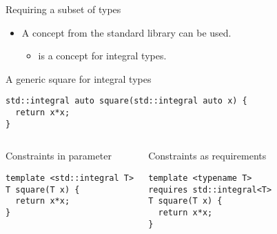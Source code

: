 \begin{frame}[t,fragile]{Requiring a subset of types}
\begin{itemize}
  \item A concept from the standard library can be used.
    \begin{itemize}
      \item {} is a concept for integral types.
    \end{itemize}
\end{itemize}

\begin{block}{A generic square for integral types}
\begin{lstlisting}
std::integral auto square(std::integral auto x) {
  return x*x;
}
\end{lstlisting}
\end{block}

\begin{columns}[T]

\begin{block}{Constraints in parameter}
\begin{lstlisting}
template <std::integral T>
T square(T x) { 
  return x*x; 
}
\end{lstlisting}
\end{block}

\begin{block}{Constraints as requirements}
\begin{lstlisting}
template <typename T>
requires std::integral<T>
T square(T x) { 
  return x*x; 
}
\end{lstlisting}
\end{block}

\end{columns}

\end{frame}


